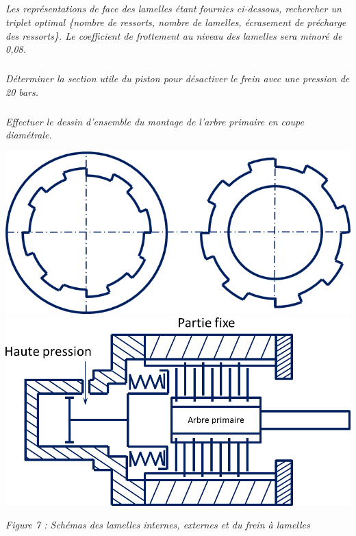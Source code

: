 \documentclass[10pt]{article}
\newif\ifprof
\begin{document}
\subparagraph{}
\textit{Les représentations de face des lamelles étant fournies ci-dessous, rechercher un triplet optimal \{nombre de ressorts, nombre de lamelles, écrasement de précharge des ressorts\}. Le coefficient de frottement au niveau des lamelles sera minoré de 0,08.}

\ifprof
\begin{corrige}
Adoptons un facteur de frottement de 0,12 entre les lamelles. Si on opte pour 20 lamelles, il y a $n=21$ surfaces frottantes. On a alors $fn\dfrac{2}{3} \dfrac{R^3-r^3}{R^2-r^2} = 0,12\cdot 21 \cdot \dfrac{2}{3} \cdot\dfrac{37,5^3-25^3}{37,5^2-25^2}=0,0798$. L'effort a fournir est donc de 1641 N.

Les ressorts ont une raideur de 40 N/mm. On a donc une longueur de ressort nécessaire de 41 mm. Il est donc possible d'utiliser 6 ressorts en parallèles avec une longueur d'écrasement  de 6,9 mm.
 
\end{corrige}
\else
\fi

\subparagraph{}
\textit{Déterminer la section utile du piston pour désactiver le frein avec une pression de 20 bars.}

\ifprof
\begin{corrige}
Pour désactiver le frein, 2 MPa sont nécessaires. La section de piston nécessaire est donc $S = \dfrac{F}{P} \simeq 820,5\,  \text{mm}^2 $ soiit un disque de diamètre 33 mm. 
\end{corrige}
\else
\fi

\subparagraph{}
\textit{Effectuer le dessin d'ensemble du montage de l'arbre primaire en coupe diamétrale.}

\ifprof
\begin{corrige}
\end{corrige}
\else
\fi


\begin{center}
\includegraphics[width=.4\textwidth]{images/lamelles}\hfill
\includegraphics[width=.45\textwidth]{images/frein}

\textit{Figure 7 : Schémas des lamelles internes, externes et du frein à lamelles}
\end{center}
\end{document}
